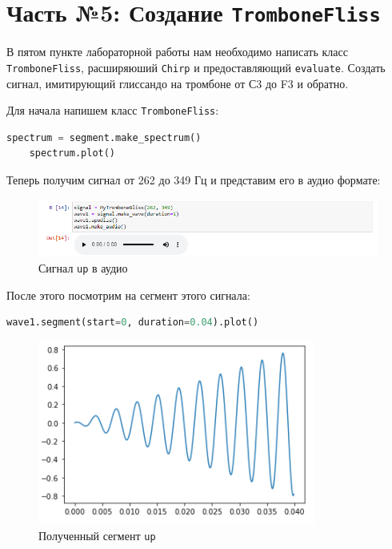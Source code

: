 \documentclass[a4paper]{article}
\begin{document}
    
    \newpage
        \section{Часть №5: Создание \texttt{TromboneFliss}}
            В пятом пункте лабораторной работы нам необходимо написать класс \texttt{TromboneFliss}, расширяюший \texttt{Chirp} и предоставляющий \texttt{evaluate}. Создать сигнал, имитирующий глиссандо на тромбоне от С3 до F3 и обратно.
            
            Для начала напишем класс \texttt{TromboneFliss}:
            
\begin{lstlisting}[language=Python, caption= Класс \texttt{TromboneFliss}]
    spectrum = segment.make_spectrum()
    spectrum.plot()
\end{lstlisting}   
            
            Теперь получим сигнал от 262 до 349 Гц и представим его в аудио формате:
            
            \begin{figure}[H]
                \centering
                \includegraphics[width=\textwidth]{ex_5_signal_up_audio.png}
                \caption{Сигнал \texttt{up} в аудио}
                \label{fig:ex_5_signal_up_audio}
            \end{figure}
            
            После этого посмотрим на сегмент этого сигнала:
            
\begin{lstlisting}[language=Python, caption= Сегмент сигнала \texttt{up}]
    wave1.segment(start=0, duration=0.04).plot()
\end{lstlisting}   
            
             \begin{figure}[H]
                \centering
                \includegraphics{ex_5_signal_up_segment.png}
                \caption{Полученный сегмент \texttt{up}}
                \label{fig:ex_5_signal_up_segment}
            \end{figure}
            
\end{document}
